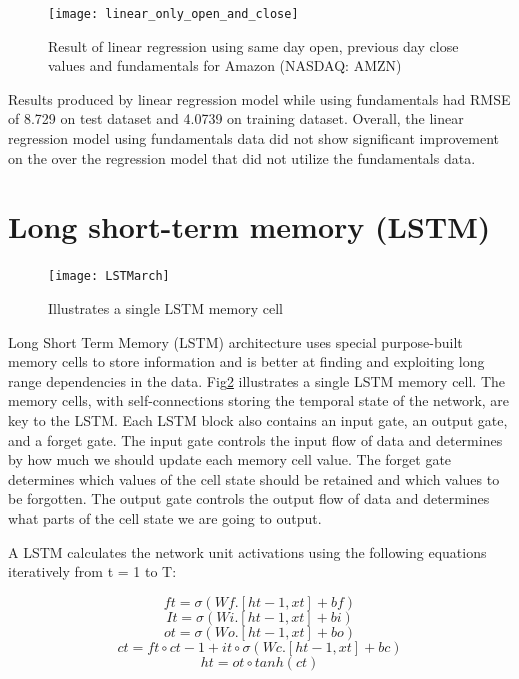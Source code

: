 \documentclass{article}
\begin{document}
\begin{figure}[H]
\centering
\texttt{[image: linear\_only\_open\_and\_close]}
\caption{Result of linear regression using same day open, previous day close values and fundamentals for Amazon (NASDAQ: AMZN)}
\label{fig:linear_withfunda}
\end{figure}

Results produced by linear regression model while using fundamentals had RMSE of 8.729 on test dataset and 4.0739 on training dataset. Overall, the linear regression model using fundamentals data did not show significant improvement on the over the regression model that did not utilize the fundamentals data.

\section{Long short-term memory (LSTM)}
\label{sec:lstm}
\begin{figure}[h]
\centering
\texttt{[image: LSTMarch]}
\caption{Illustrates a single LSTM memory cell}
\label{fig:lstmcell}
\end{figure}

Long Short Term Memory (LSTM) architecture\cite{hochreiter_schmidhuber_1997} uses special purpose-built memory cells to store information and is better at finding and exploiting long range dependencies in the data. Fig\ref{fig:lstmcell} illustrates a single LSTM memory cell. The memory cells, with self-connections storing the temporal state of the network, are key to the LSTM. Each LSTM block also contains an input gate, an output gate, and a forget gate. The input gate controls the input flow of data and determines by how much we should update each memory cell value. The forget gate determines which values of the cell state should be retained and which values to be forgotten. The output gate controls the output flow of data and determines what parts of the cell state we are going to output.

A LSTM calculates the network unit activations using the following equations iteratively from t = 1 to T:

\begin{equation}
ft  = \sigma ( Wf.[ht-1, xt] + bf)
\end{equation}
\begin{equation}
It  = \sigma ( Wi.[ht-1, xt] + bi)
\end{equation}
\begin{equation}
ot  = \sigma ( Wo.[ht-1, xt] + bo)
\end{equation}
\begin{equation}
ct = ft \circ ct-1  +  it \circ\sigma ( Wc.[ht-1, xt] + bc)
\end{equation}
\begin{equation}
ht = ot \circ tanh(ct)
\end{equation}
\end{document}
